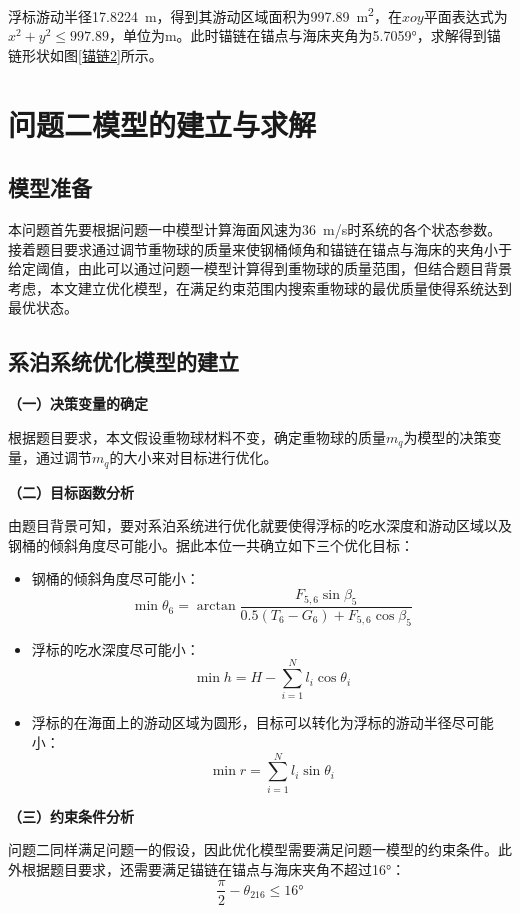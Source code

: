\documentclass{article}
\numberwithin{equation}{subsection}
\begin{document}
浮标游动半径\SI{17.8224}{m}，得到其游动区域面积为\SI{997.89}{m^{2}}，在$xoy$平面表达式为$x^{2}+y^{2}\le997.89$，单位为m。此时锚链在锚点与海床夹角为5.7059°，求解得到锚链形状如图\ref{锚链2}所示。

\section{问题二模型的建立与求解}
\subsection{模型准备}
本问题首先要根据问题一中模型计算海面风速为\SI{36}{m/s}时系统的各个状态参数。接着题目要求通过调节重物球的质量来使钢桶倾角和锚链在锚点与海床的夹角小于给定阈值，由此可以通过问题一模型计算得到重物球的质量范围，但结合题目背景考虑，本文建立优化模型，在满足约束范围内搜索重物球的最优质量使得系统达到最优状态。

\subsection{系泊系统优化模型的建立}
\begin{flushleft}
\textbf{（一）决策变量的确定}
\end{flushleft}
根据题目要求，本文假设重物球材料不变，确定重物球的质量$m_{q}$为模型的决策变量，通过调节$m_{q}$的大小来对目标进行优化。

\begin{flushleft}
\textbf{（二）目标函数分析}
\end{flushleft}
由题目背景可知，要对系泊系统进行优化就要使得浮标的吃水深度和游动区域以及钢桶的倾斜角度尽可能小。据此本位一共确立如下三个优化目标：
\begin{itemize}
\item 钢桶的倾斜角度尽可能小：
$$\min\theta_{6}=\arctan\frac{F_{5,6}\sin\beta_{5}}{0.5(T_{6}-G_{6})+F_{5,6}\cos\beta_{5}}$$
\item 浮标的吃水深度尽可能小：
$$\min h=H-\sum_{i=1}^{N}l_{i}\cos\theta_{i}$$
\item 浮标的在海面上的游动区域为圆形，目标可以转化为浮标的游动半径尽可能小：
$$\min r=\sum_{i=1}^{N}l_{i}\sin\theta_{i}$$
\end{itemize}

\begin{flushleft}
\textbf{（三）约束条件分析}
\end{flushleft}

问题二同样满足问题一的假设，因此优化模型需要满足问题一模型的约束条件。此外根据题目要求，还需要满足锚链在锚点与海床夹角不超过16°：
\begin{equation}
    \frac{\pi}{2}-\theta_{216}\le16°
\end{equation}
\end{document}
